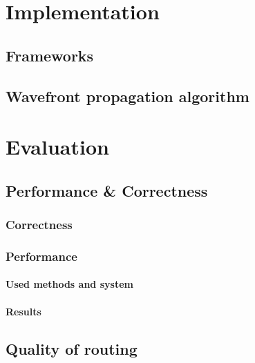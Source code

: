 \documentclass[
	11pt,
	a4paper,
	usegeometry,
	twoside,
	openright,
	toc=chapterentrywithdots
]{scrbook}
\begin{document}
	
	\chapter{Implementation}
	
		\section{Frameworks}
		
	
		\section{Wavefront propagation algorithm}
		
	
	\chapter{Evaluation}
	
		\section{Performance \& Correctness}
		
			\subsection{Correctness}
			
			\subsection{Performance}
			
			\subsubsection{Used methods and system}
			
			
			\subsubsection{Results}
		
		\section{Quality of routing}
		
\end{document}
